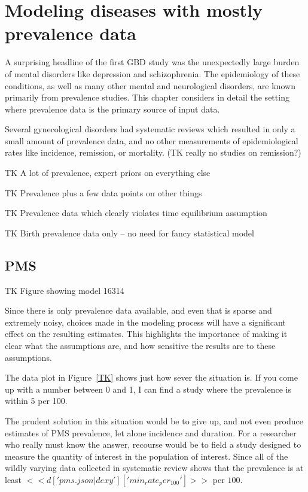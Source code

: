 \section{Modeling diseases with mostly prevalence data}

A surprising headline of the first GBD study was the unexpectedly
large burden of mental disorders like depression and
schizophrenia. The epidemiology of these conditions, as well as many
other mental and neurological disorders, are known primarily from
prevalence studies. This chapter considers in detail the setting where
prevalence data is the primary source of input data.

Several gynecological disorders had systematic reviews which resulted
in only a small amount of prevalence data, and no other measurements
of epidemiological rates like incidence, remission, or mortality.  (TK
really no studies on remission?)

TK A lot of prevalence, expert priors on everything else

TK Prevalence plus a few data points on other things

TK Prevalence data which clearly violates time equilibrium assumption

TK Birth prevalence data only -- no need for fancy statistical model

\subsection{PMS}
TK Figure showing model 16314

Since there is only prevalence data available, and even that is sparse
and extremely noisy, choices made in the modeling process will have a
significant effect on the resulting estimates.  This highlights the
importance of making it clear what the assumptions are, and how
sensitive the results are to these assumptions.

The data plot in Figure~\ref{TK} shows just how sever the situation
is.  If you come up with a number between 0 and 1, I can find a study
where the prevalence is within 5 per 100.

The prudent solution in this situation would be to give up, and not
even produce estimates of PMS prevalence, let alone incidence and
duration.  For a researcher who really must know the answer, recourse
would be to field a study designed to measure the quantity of interest
in the population of interest.  Since all of the wildly varying data
collected in systematic review shows that the prevalence is at least
$<<d['pms.json|dexy']['min_rate_per_100']>>$ per $100$.

